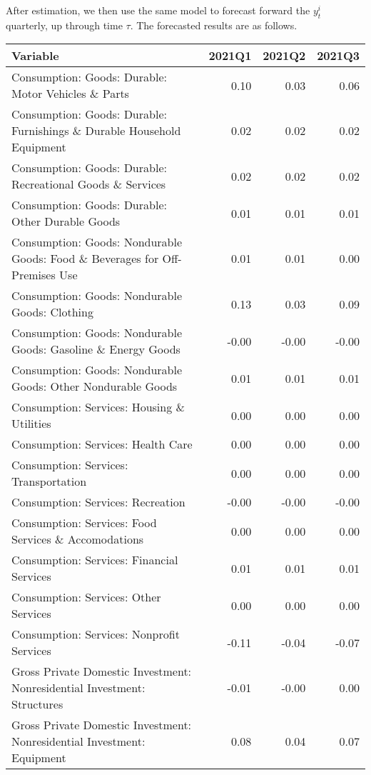 \documentclass[11pt, letterpaper]{article}\usepackage[]{graphicx}\usepackage[]{color}
\begin{document}
After estimation, we then use the same model to forecast forward the $y^i_t$ quarterly, up through time $\tau$. 
The forecasted results are as follows.
\begin{table}[H]
\centering
\begingroup\scriptsize
\begin{tabular}{lrrr}
  \hline
Variable & 2021Q1 & 2021Q2 & 2021Q3 \\ 
  \hline
Consumption: Goods: Durable: Motor Vehicles \& Parts & 0.10 & 0.03 & 0.06 \\ 
  Consumption: Goods: Durable: Furnishings \& Durable Household Equipment & 0.02 & 0.02 & 0.02 \\ 
  Consumption: Goods: Durable: Recreational Goods \& Services & 0.02 & 0.02 & 0.02 \\ 
  Consumption: Goods: Durable: Other Durable Goods & 0.01 & 0.01 & 0.01 \\ 
  Consumption: Goods: Nondurable Goods: Food \& Beverages for Off-Premises Use & 0.01 & 0.01 & 0.00 \\ 
  Consumption: Goods: Nondurable Goods: Clothing & 0.13 & 0.03 & 0.09 \\ 
  Consumption: Goods: Nondurable Goods: Gasoline \& Energy Goods & -0.00 & -0.00 & -0.00 \\ 
  Consumption: Goods: Nondurable Goods: Other Nondurable Goods & 0.01 & 0.01 & 0.01 \\ 
  Consumption: Services: Housing \& Utilities & 0.00 & 0.00 & 0.00 \\ 
  Consumption: Services: Health Care & 0.00 & 0.00 & 0.00 \\ 
  Consumption: Services: Transportation & 0.00 & 0.00 & 0.00 \\ 
  Consumption: Services: Recreation & -0.00 & -0.00 & -0.00 \\ 
  Consumption: Services: Food Services \& Accomodations & 0.00 & 0.00 & 0.00 \\ 
  Consumption: Services: Financial Services & 0.01 & 0.01 & 0.01 \\ 
  Consumption: Services: Other Services & 0.00 & 0.00 & 0.00 \\ 
  Consumption: Services: Nonprofit Services & -0.11 & -0.04 & -0.07 \\ 
  Gross Private Domestic Investment: Nonresidential Investment: Structures & -0.01 & -0.00 & 0.00 \\ 
  Gross Private Domestic Investment: Nonresidential Investment: Equipment & 0.08 & 0.04 & 0.07 \\ 

\end{tabular}
\end{table}
\end{document}
